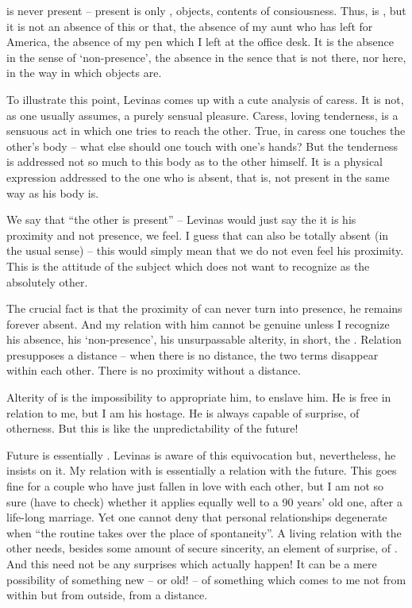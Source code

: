 % 
 is never present -- present is only , objects, contents of consiousness.
Thus,  is , but it is not an absence of this or that, the absence 
of my aunt who has left for America, the absence of my pen which I left at the office desk. 
It is the absence in the sense of `non-presence', the absence in the sence that 
 is not there, nor here, in the way in which objects are.

To illustrate this point, Levinas comes up with a cute analysis of caress. It is not, as one
usually assumes, a purely sensual pleasure. Caress, loving
tenderness, is a sensuous act in which one tries to reach  the other. True, in caress one 
touches the other's body -- what else should one touch with one's hands? But the tenderness is 
addressed not so much to this body as to the other himself. 
It is a physical expression addressed to the one who is absent, that is, not present in the 
same way as his body is.

We say that ``the other is present'' -- Levinas would just say the it is his proximity
and not presence, we feel.
I guess that  can also be totally absent (in the usual sense) -- this would simply mean
that we do not even feel his proximity. This is the attitude of the subject which does not 
want to recognize  as the absolutely other.

The crucial fact is that the proximity of  can never turn into presence,
he remains forever absent. And my relation with him cannot be genuine unless I recognize his
absence, his `non-presence', his unsurpassable alterity, in short, the . 
Relation presupposes a distance -- when there is no
distance, the two terms disappear within each other. There is no proximity without a distance.

Alterity of  is the impossibility to appropriate him, to enslave him. He is free 
in relation to me, but I am his hostage. He is always capable of surprise, of otherness.
But this is like the unpredictability of the future!

Future is essentially . Levinas is aware of this equivocation but, nevertheless,  
he insists on it. My relation with  is essentially a relation with the future. This
goes fine for a couple who have just fallen in love with each other, but I am not so sure (have to check)
whether
it applies equally well to a 90 years' old one, after a life-long marriage. Yet one cannot 
deny that personal relationships degenerate when ``the routine takes over the place of 
spontaneity''.
A living relation with the other needs, besides some amount of secure sincerity, an element
of surprise, of . And this need not be any surprises which actually happen! It 
can be a mere possibility of something new -- or old! -- of something which comes to me not
from within but from outside, from a distance.


